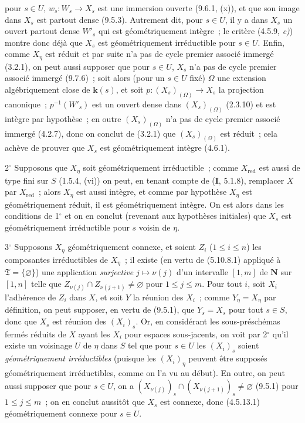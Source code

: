 
pour $s\in U$, $w_s:W_s\to X_s$ est une immersion ouverte (9.6.1, (x)), et que
son image dans $X_s$ est partout dense (9.5.3). Autrement dit, pour $s\in U$,
il y a dans $X_s$ un ouvert partout dense $W'_s$ qui est géométriquement
intègre~; le critère (4.5.9, \emph{c)}) montre donc déjà que $X_s$ est
géométriquement irréductible pour $s\in U$. Enfin, comme $X_\eta$ est réduit et
par suite n'a pas de cycle premier associé immergé (3.2.1), on peut aussi
supposer que pour $s\in U$, $X_s$ n'a pas de cycle premier associé immergé
(9.7.6)~; soit alors (pour un $s\in U$ fixé) $\Omega$ une extension
algébriquement close de $\boldsymbol{k}(s)$, et soit
$p:(X_s)_{(\Omega)}\to X_s$ la projection canonique~; $p^{-1}(W'_s)$ est un
ouvert dense dans $(X_s)_{(\Omega)}$ (2.3.10) et est intègre par hypothèse~; en
outre $(X_s)_{(\Omega)}$ n'a pas de cycle premier associé immergé (4.2.7), donc
on conclut de (3.2.1) que $(X_s)_{(\Omega)}$ est réduit~; cela achève de prouver
que $X_s$ est géométriquement intègre (4.6.1).

2$^\circ$ Supposons que $X_\eta$ soit géométriquement irréductible~; comme
$X_{\mathrm{red}}$ est aussi de type fini sur $S$ (1.5.4, (vi)) on peut, en
tenant compte de (\textbf{I}, 5.1.8), remplacer $X$ par $X_{\mathrm{red}}$~;
alors $X_\eta$ est aussi intègre, et comme par hypothèse $X_\eta$ est
géométriquement réduit, il est géométriquement intègre. On est alors dans les
conditions de 1$^\circ$ et on en conclut (revenant aux hypothèses initiales) que
$X_s$ est géométriquement irréductible pour $s$ voisin de $\eta$.

3$^\circ$ Supposons $X_\eta$ géométriquement connexe, et soient $Z_i$
($1\leqslant i\leqslant n$) les composantes irréductibles de $X_\eta$~; il
existe (en vertu de (5.10.8.1) appliqué à $\mathfrak T=\{\varnothing\}$) une
application \emph{surjective} $j\mapsto\nu(j)$ d'un intervalle $[1,m]$ de
$\mathbf N$ sur $[1,n]$ telle que
$Z_{\nu(j)}\cap Z_{\nu(j+1)}\neq\varnothing$ pour $1\leqslant j\leqslant m$.
Pour tout $i$, soit $X_i$ l'adhérence de $Z_i$ dans $X$, et soit $Y$ la réunion
des $X_i$~; comme $Y_\eta=X_\eta$ par définition, on peut supposer, en vertu de
(9.5.1), que $Y_s=X_s$ pour tout $s\in S$, donc que $X_s$ est réunion des
$(X_i)_s$. Or, en considérant les sous-préschémas fermés réduits de $X$ ayant
les $X_i$ pour espaces sous-jacents, on voit par 2$^\circ$ qu'il existe un
voisinage $U$ de $\eta$ dans $S$ tel que pour $s\in U$ les $(X_i)_s$ soient
\emph{géométriquement irréductibles} (puisque les $(X_i)_\eta$ peuvent être
supposés géométriquement irréductibles, comme on l'a vu au début). En outre, on
peut aussi supposer que pour $s\in U$, on a
$(X_{\nu(j)})_s\cap(X_{\nu(j+1)})_s\neq\varnothing$ (9.5.1) pour
$1\leqslant j\leqslant m$~; on en conclut aussitôt que $X_s$ est connexe, donc
(4.5.13.1) géométriquement connexe pour $s\in U$.


